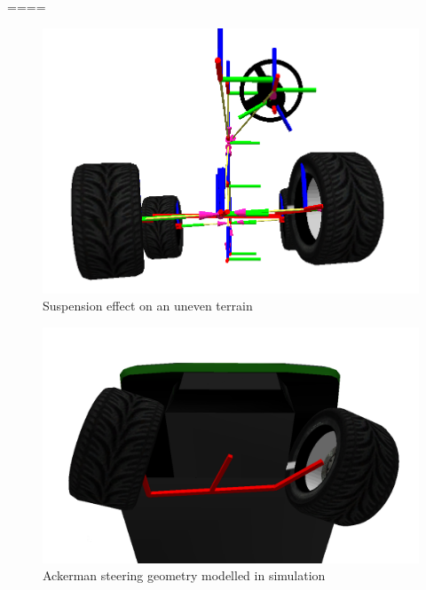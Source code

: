  
 
 
 ====
 
 
\begin{figure}[ht]
	\begin{minipage}[b]{1\linewidth}
	    \centering
	    \includegraphics[width=\textwidth]{modelo_carina/carina_rviz_uneven_susp.png}
	 	\caption{Suspension effect on an uneven terrain}
	 	\label{fig:uneven}
	\end{minipage}
\end{figure}


\begin{figure}[ht]
	\begin{minipage}[b]{1\linewidth}
	    \centering
	    \includegraphics[width=\textwidth]{modelo_carina/carina_rviz_steering.png}
	 	\caption{Ackerman steering geometry modelled in simulation}
	 	\label{fig:ackermann}
	\end{minipage}
\end{figure}



